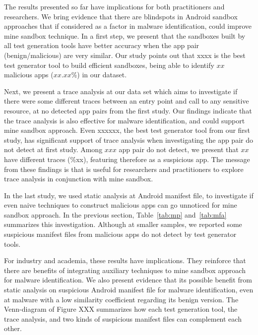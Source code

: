 The results presented so far have implications for both practitioners and researchers. We bring evidence that there are blindspots in Android sandbox approaches that if considered as a factor in malware identification, could improve mine sandbox technique. 
In a first step, we present that the sandboxes built by all test generation tools have better accuracy when the app pair (benign/malicious) are very similar. Our study points out that xxxx is the best test generator tool to build efficient sandboxes, being able to identify $xx$ malicious apps ($xx.xx$\%) in our dataset.

Next, we present a trace analysis at our data set which aims to investigate if there were some different traces between an entry point and call to any sensitive resource, at no detected app pairs from the first study. Our findings indicate that the trace analysis is also effective for malware identification, and could support mine sandbox approach. Even xxxxxx, the best test generator tool from our first study, has significant support of trace analysis when investigating the app pair do not detect at first study. Among $xxx$ app pair do not detect, we present that $xx$ have different traces (\%xx), featuring therefore as a suspicious app. The message from these findings is that is useful for researchers and practitioners to explore trace analysis in conjunction with mine sandbox.

In the last study, we used static analysis at Android manifest file, to investigate if even naive techniques to construct malicious apps can go unnoticed for mine sandbox approach. In the previous section, Table~\ref{tab:mp} and~\ref{tab:mfa} summarizes this investigation. Although at smaller samples, we reported some suspicious manifest files from malicious apps do not detect by test generator tools.

For industry and academia, these results have implications. They reinforce that there are benefits of integrating auxiliary techniques to mine sandbox approach for malware identification. We also present evidence that its possible benefit from static analysis on suspicious Android manifest file for malware identification, even at malware with a low similarity coefficient regarding its benign version. The Venn-diagram of Figure XXX summarizes how each test generation tool, the trace analysis, and two kinds of suspicious manifest files can complement each other.
